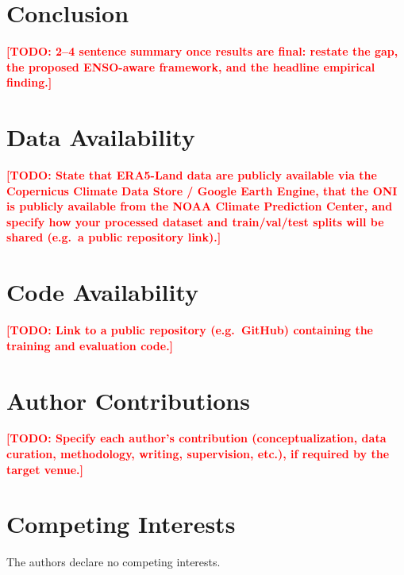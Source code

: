\documentclass[conference]{IEEEtran}
\newcommand{\TODO}[1]{\textcolor{red}{\textbf{[TODO: #1]}}}
\begin{document}
\section{Conclusion}
\label{sec:conclusion}

\TODO{2--4 sentence summary once results are final: restate the gap, the proposed ENSO-aware framework,
and the headline empirical finding.}

\section*{Data Availability}
\TODO{State that ERA5-Land data are publicly available via the Copernicus Climate Data Store / Google
Earth Engine, that the ONI is publicly available from the NOAA Climate Prediction Center, and specify
how your processed dataset and train/val/test splits will be shared (e.g.\ a public repository link).}

\section*{Code Availability}
\TODO{Link to a public repository (e.g.\ GitHub) containing the training and evaluation code.}

\section*{Author Contributions}
\TODO{Specify each author's contribution (conceptualization, data curation, methodology, writing,
supervision, etc.), if required by the target venue.}

\section*{Competing Interests}
The authors declare no competing interests.



\end{document}
